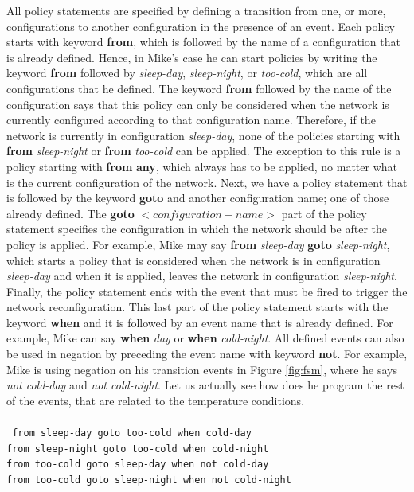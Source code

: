 All policy statements are specified by defining a transition from one, or
more, configurations to another configuration in the presence of an event.
Each policy starts with keyword \textbf{from}, which is followed by the
name of a configuration that is already defined. Hence, in Mike's case he
can start policies by writing the keyword \textbf{from} followed by
\textit{sleep-day}, \textit{sleep-night}, or \textit{too-cold}, which are
all configurations that he defined. The keyword \textbf{from} followed by
the name of the configuration says that this policy can only be considered 
when the network is currently configured according to that configuration
name. Therefore, if the network is currently in configuration
\textit{sleep-day}, none of the policies starting with \textbf{from}
\textit{sleep-night} or \textbf{from} \textit{too-cold} can be applied. The
exception to this rule is a policy starting with \textbf{from}
\textbf{any}, which always has to be applied, no matter what is the current
configuration of the network. Next, we have a policy statement that is
followed by the keyword \textbf{goto} and another configuration name; one
of those already defined. The \textbf{goto} $<configuration-name>$ part of 
the policy statement specifies the configuration in which the network
should be after the policy is applied. For example, Mike may say
\textbf{from} \textit{sleep-day} \textbf{goto} \textit{sleep-night}, which 
starts a policy that is considered when the network is in configuration
\textit{sleep-day} and when it is applied, leaves the network in
configuration \textit{sleep-night}. Finally, the policy statement ends with
the event that must be fired to trigger the network reconfiguration. This
last part of the policy statement starts with the keyword \textbf{when} and
it is followed by an event name that is already defined. For example, Mike 
can say \textbf{when} \textit{day} or \textbf{when} \textit{cold-night}.
All defined events can also be used in negation by preceding the event name
with keyword \textbf{not}. For example, Mike is using negation on his
transition events in Figure \ref{fig:fsm}, where he says
\textit{not cold-day} and \textit{not cold-night}. Let us actually see how 
does he program the rest of the events, that are related to the temperature
conditions.								\\
\\
\texttt{
from sleep-day goto too-cold when cold-day				\\
from sleep-night goto too-cold when cold-night				\\
from too-cold goto sleep-day when not cold-day				\\
from too-cold goto sleep-night when not cold-night			\\
}									\\
